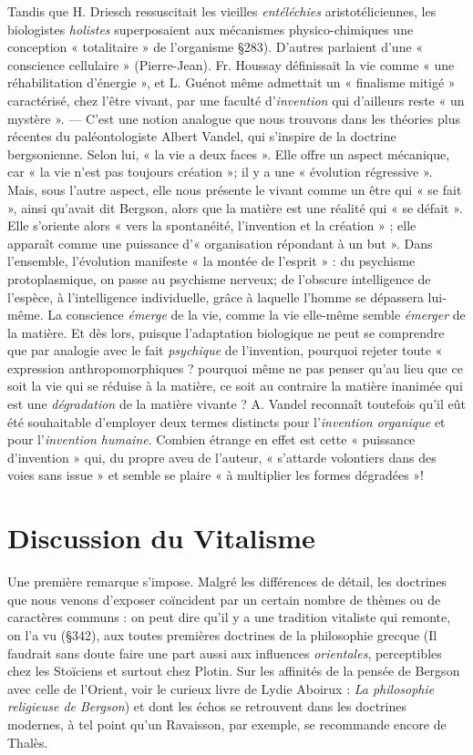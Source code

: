 \vspace{0.24cm}
{\footnotesize Tandis que H. Driesch ressuscitait les vieilles {\it entéléchies} aristotéliciennes,
les biologistes {\it holistes} superposaient aux mécanismes physico-chimiques une
conception « totalitaire » de l'organisme \S283). D’autres parlaient d'une
« conscience cellulaire » (Pierre-Jean). Fr. Houssay définissait la vie
comme « une réhabilitation d'énergie », et L. Guénot même admettait un
« finalisme mitigé » caractérisé, chez l'être vivant, par une faculté d'{\it invention}
qui d'ailleurs reste « un mystère ». — C'est une notion analogue que
nous trouvons dans les théories plus récentes du paléontologiste Albert Vandel,
qui s'inspire de la doctrine bergsonienne. Selon lui, « la vie a deux faces ».
Elle offre un aspect mécanique, car « la vie n’est pas toujours création »;
il y a une « évolution régressive ». Mais, sous l’autre aspect, elle nous présente
le vivant comme un être qui « se fait », ainsi qu'avait dit Bergson,
alors que la matière est une réalité qui « se défait ». Elle s'oriente alors
« vers la spontanéité, l'invention et la création » ; elle apparaît comme une
puissance d'« organisation répondant à un but ». Dans l’ensemble, l'évolution
manifeste « la montée de l’esprit » : du psychisme protoplasmique, on
passe au psychisme nerveux; de l'obscure intelligence de l'espèce, à l’intelligence
individuelle, grâce à laquelle l’homme se dépassera lui-même.
La conscience {\it émerge} de la vie, comme la vie elle-même semble {\it émerger}
de la matière. Et dès lors, puisque l'adaptation biologique ne peut se
comprendre que par analogie avec le fait {\it psychique} de l'invention, pourquoi
rejeter toute « expression anthropomorphiques ? pourquoi même ne pas
penser qu’au lieu que ce soit la vie qui se réduise à la matière, ce soit au
contraire la matière inanimée qui est une {\it dégradation} de la matière vivante ?
A. Vandel reconnaît toutefois qu'il eût été souhaitable d'employer deux
termes distincts pour l'{\it invention organique} et pour l'{\it invention humaine}.
Combien étrange en effet est cette « puissance d'invention » qui, du propre
aveu de l’auteur, « s’attarde volontiers dans des voies sans issue » et semble
se plaire « à multiplier les formes dégradées »!}
\vspace{0.31cm}


\section{Discussion du Vitalisme}%
Une première remarque
s'impose. Malgré les différences de détail, les doctrines que nous
venons d’exposer coïncident par un certain nombre de thèmes ou de
caractères communs : on peut dire qu’il y a une tradition vitaliste
qui remonte, on l’a vu (\S 342), aux toutes premières doctrines de la
philosophie grecque
{\scriptsize (Il faudrait sans doute faire une part aussi aux influences {\it orientales}, perceptibles
chez les Stoïciens et surtout chez Plotin. Sur les affinités de la pensée de Bergson avec
celle de l'Orient, voir le curieux livre de Lydie Aboirux :
{\it La philosophie religieuse de Bergson})} et dont les échos se retrouvent dans les doctrines
modernes, à tel point qu’un Ravaisson, par exemple, se recommande
encore de Thalès.

